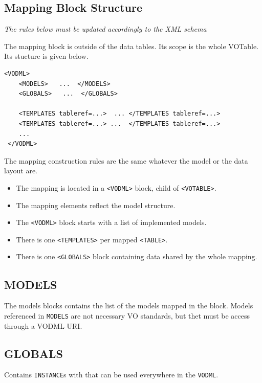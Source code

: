 \documentclass[11pt,a4paper]{ivoa}
\begin{document}
\subsection{Mapping Block Structure}

\textit{The rules below must be updated accordingly to the XML schema}

The mapping block is outside of the data tables. Its scope is the whole VOTable. Its stucture is given below.

\begin{lstlisting}[caption={INSTANCE bloc example},captionpos=b]
 <VODML>
    <MODELS>   ...  </MODELS>
    <GLOBALS>   ...  </GLOBALS>

    <TEMPLATES tableref=...>  ... </TEMPLATES tableref=...>
    <TEMPLATES tableref=...> ...  </TEMPLATES tableref=...>
    ...
 </VODML>
\end{lstlisting}

The mapping construction rules are the same whatever the model or the data layout are.

\begin{itemize}
    \item The mapping is located in a \texttt{<VODML>} block, child of \texttt{<VOTABLE>}.
    \item The mapping elements reflect the model structure.
    \item The \texttt{<VODML>} block starts with a list of implemented models.
    \item There is one \texttt{<TEMPLATES>} per mapped \texttt{<TABLE>}.
    \item There is one \texttt{<GLOBALS>} block containing data shared by the whole mapping.
\end{itemize}

\subsection{MODELS}

The models blocks contains the list of the models mapped in the block. Models referenced in \texttt{MODELS} are not necessary VO standards, but thet must be access through a VODML URI.

\subsection{GLOBALS}

Contains  \texttt{INSTANCE}s with that can be used everywhere in the \texttt{VODML}.
\end{document}
